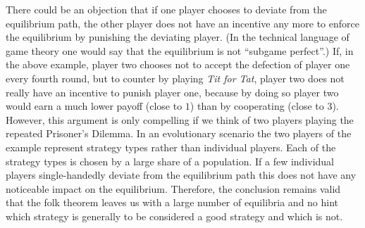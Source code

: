 There could be an objection that if one player chooses to deviate from the
equilibrium path, the other player does not have an incentive any more to
enforce the equilibrium by punishing the deviating player. (In the technical
language of game theory one would say that the equilibrium is not ``subgame
perfect''.)  If, in the above example, player two chooses not to accept the
defection of player one every fourth round, but to counter by playing {\em Tit
  for Tat}, player two does not really have an incentive to punish player one,
because by doing so player two would earn a much lower payoff (close to $1$)
than by cooperating (close to $3$).  However, this argument is only compelling
if we think of two players playing the repeated Prisoner's Dilemma.  In an
evolutionary scenario the two players of the example represent strategy types
rather than individual players. Each of the strategy types is chosen by a large
share of a population. If a few individual players single-handedly deviate
from the equilibrium path this does not have any noticeable impact on the
equilibrium. Therefore, the conclusion remains valid that the folk theorem
leaves us with a large number of equilibria and no hint which strategy is
generally to be considered a good strategy and which is not.

